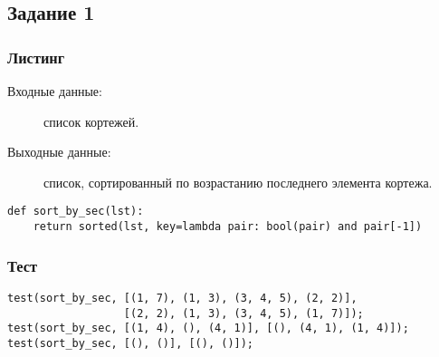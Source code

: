 \documentclass[12pt, a4paper] {ncc}
\begin{document}
    \subsection{Задание 1}
        \subsubsection{Листинг}
        \begin{description}
            \item[Входные данные:] список кортежей.
            \item[Выходные данные:] список, сортированный по возрастанию последнего элемента кортежа. 
        \end{description}
        \begin{lstlisting}
def sort_by_sec(lst):
    return sorted(lst, key=lambda pair: bool(pair) and pair[-1])
        \end{lstlisting}

        \subsubsection{Тест}

        \begin{lstlisting}
test(sort_by_sec, [(1, 7), (1, 3), (3, 4, 5), (2, 2)],
                  [(2, 2), (1, 3), (3, 4, 5), (1, 7)]);
test(sort_by_sec, [(1, 4), (), (4, 1)], [(), (4, 1), (1, 4)]);
test(sort_by_sec, [(), ()], [(), ()]);
        \end{lstlisting}
\end{document}
